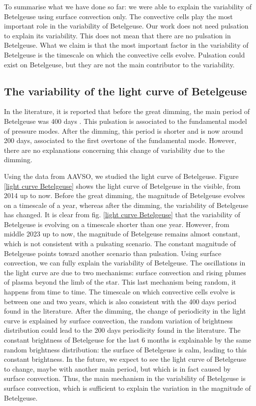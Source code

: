 \documentclass{aa}
\begin{document}
To summarise what we have done so far: we were able to explain the variability of Betelgeuse using surface convection only. The convective cells play 
the most important role in the variability of Betelgeuse. Our work does not need pulsation to explain its variability. This does not mean that there are 
no pulsation in Betelgeuse. What we claim is that the most important factor in the variability of Betelgeuse is the timescale on which the convective 
cells evolve. Pulsation could exist on Betelgeuse, but they are not the main contributor to the variability. 

\subsection{The variability of the light curve of Betelgeuse}

In the literature, it is reported that before the great dimming, the main period of Betelgeuse was 400 days \citep{kiss_variability_2006}. 
This pulsation is associated to the fundamental model of pressure modes. After the dimming, this period is shorter and is now around 200 days, 
associated to the first overtone of the fundamental mode. However, there are no explanations concerning this change of variability due to the dimming.


Using the data from AAVSO, we studied the light curve of Betelgeuse. Figure \ref{light curve Betelgeuse} shows the light curve of Betelgeuse in the visible, 
from 2014 up to now. Before the great dimming, the magnitude of Betelgeuse evolves on a timescale of a year, whereas after the dimming, the variability of Betelgeuse has changed. It is clear from fig. \ref{light curve Betelgeuse} that the 
variability of Betelgeuse is evolving on a timescale shorter than one year. However, from middle 2023 up to now, the magnitude of Betelgeuse remains almost 
constant, which is not consistent with a pulsating scenario. The constant magnitude of Betelgeuse points toward another scenario than pulsation. Using surface 
convection, we can fully explain the variability of Betelgeuse. The oscillations in the light curve are due to two mechanisms: surface convection and rising 
plumes of plasma beyond the limb of the star. This last mechanism being random, it happens from time to time. The timescale on which convective cells evolve
is between one and two years, which is also consistent with the 400 days period found in the literature.  After the dimming, the change of periodicity in the
light curve is explained by surface convection, the random variation of brightness distribution could lead to the 200 days periodicity found in the literature. 
The constant brightness of Betelgeuse for the last 6 months is explainable by the same random brightness distribution: the surface of Betelgeuse is calm, 
leading to this constant brightness. In the future, we expect to see the light curve of Betelgeuse to change, maybe with another main period, but which 
is in fact caused by surface convection. Thus, the main mechanism in the variability of Betelgeuse is surface convection, which is sufficient to explain the 
variation in the magnitude of Betelgeuse.  
\end{document}
